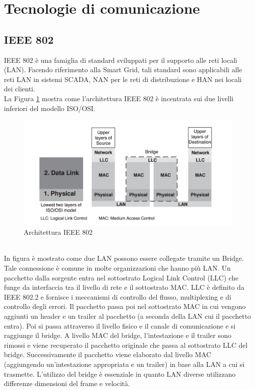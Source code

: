 \section{Tecnologie di comunicazione}
\subsection{IEEE 802}
IEEE 802 è una famiglia di standard sviluppati per il supporto alle reti locali (LAN). Facendo riferimento alla Smart Grid, tali standard sono applicabili alle reti LAN in sistemi SCADA, NAN per le reti di distribuzione e HAN nei locali dei clienti.\\
La Figura \ref{fig:arch_802} mostra come l'architettura IEEE 802 è incentrata sui due livelli inferiori del modello ISO/OSI.
\begin{figure}[h]
	\centering
	\includegraphics[scale=0.320]{imgs/arch_ieee802.png}
	\caption{Architettura IEEE 802} \label{fig:arch_802}
\end{figure}
\\
In figura è mostrato come due LAN possono essere collegate tramite un Bridge. Tale connessione è comune in molte organizzazioni che hanno più LAN. Un pacchetto dalla sorgente entra nel sottostrato Logical Link Control (LLC) che funge da interfaccia tra il livello di rete e il sottostrato MAC. LLC è definito da IEEE 802.2 e fornisce i meccanismi di controllo del flusso, multiplexing e di controllo degli errori. Il pacchetto passa poi nel sottostrato MAC in cui vengono aggiunti un header e un trailer al pacchetto (a seconda della LAN cui il pacchetto entra). Poi si passa attraverso il livello fisico e il canale di comunicazione e si raggiunge il bridge. A livello MAC del bridge, l'intestazione e il trailer sono rimossi e viene recuperato il pacchetto originale che passa al sottostrato LLC del bridge. Successivamente il pacchetto viene elaborato dal livello MAC (aggiungendo un'intestazione appropriata e un trailer) in base alla LAN a cui si trasmette. L'utilizzo del bridge è essenziale in quanto LAN diverse utilizzano differenze dimensioni del frame e velocità.
